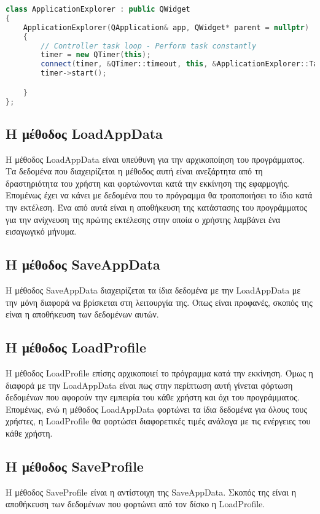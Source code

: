 \begin{lstlisting}[language=C++, style=cppstyle]
class ApplicationExplorer : public QWidget
{
    ApplicationExplorer(QApplication& app, QWidget* parent = nullptr) : QWidget(parent), app(app)
    {
        // Controller task loop - Perform task constantly
        timer = new QTimer(this);
        connect(timer, &QTimer::timeout, this, &ApplicationExplorer::TaskGamepadConnection);
        timer->start();

    }
};
\end{lstlisting}



\subsection{Η μέθοδος LoadAppData}
Η μέθοδος LoadAppData είναι υπεύθυνη για την αρχικοποίηση του προγράμματος. Τα
δεδομένα που διαχειρίζεται η μέθοδος αυτή είναι ανεξάρτητα από τη δραστηριότητα
του χρήστη και φορτώνονται κατά την εκκίνηση της εφαρμογής. Επομένως έχει να 
κάνει με δεδομένα που το πρόγραμμα θα τροποποιήσει το ίδιο κατά την εκτέλεση. 
Ένα από αυτά είναι η αποθήκευση της κατάστασης του προγράμματος για την ανίχνευση 
της πρώτης εκτέλεσης στην οποία ο χρήστης λαμβάνει ένα εισαγωγικό μήνυμα.



\subsection{Η μέθοδος SaveAppData}
Η μέθοδος SaveAppData διαχειρίζεται τα ίδια δεδομένα με την LoadAppData με την μόνη
διαφορά να βρίσκεται στη λειτουργία της. Όπως είναι προφανές, σκοπός της είναι η
αποθήκευση των δεδομένων αυτών.

\subsection{Η μέθοδος LoadProfile}
Η μέθοδος LoadProfile επίσης αρχικοποιεί το πρόγραμμα κατά την εκκίνηση. Όμως η διαφορά
με την LoadAppData είναι πως στην περίπτωση αυτή γίνεται φόρτωση δεδομένων που αφορούν
την εμπειρία του κάθε χρήστη και όχι του προγράμματος. Επομένως, ενώ η μέθοδος LoadAppData
φορτώνει τα ίδια δεδομένα για όλους τους χρήστες, η LoadProfile θα φορτώσει διαφορετικές
τιμές ανάλογα με τις ενέργειες του κάθε χρήστη.

\subsection{Η μέθοδος SaveProfile}
Η μέθοδος SaveProfile είναι η αντίστοιχη της SaveAppData. Σκοπός της είναι η αποθήκευση
των δεδομένων που φορτώνει από τον δίσκο η LoadProfile.



